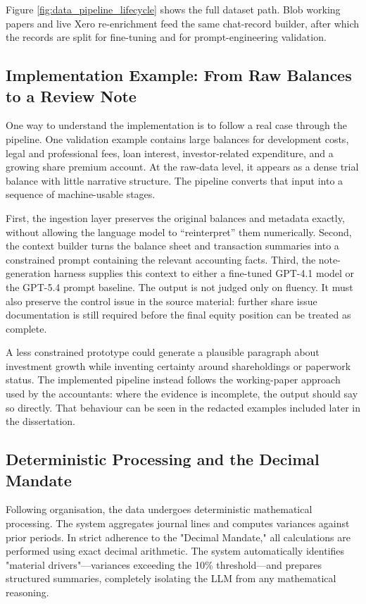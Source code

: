 Figure \ref{fig:data_pipeline_lifecycle} shows the full dataset path. Blob working papers and live Xero re-enrichment feed the same chat-record builder, after which the records are split for fine-tuning and for prompt-engineering validation.

\subsection{Implementation Example: From Raw Balances to a Review Note}
One way to understand the implementation is to follow a real case through the pipeline. One validation example contains large balances for development costs, legal and professional fees, loan interest, investor-related expenditure, and a growing share premium account. At the raw-data level, it appears as a dense trial balance with little narrative structure. The pipeline converts that input into a sequence of machine-usable stages.

First, the ingestion layer preserves the original balances and metadata exactly, without allowing the language model to ``reinterpret'' them numerically. Second, the context builder turns the balance sheet and transaction summaries into a constrained prompt containing the relevant accounting facts. Third, the note-generation harness supplies this context to either a fine-tuned GPT-4.1 model or the GPT-5.4 prompt baseline. The output is not judged only on fluency. It must also preserve the control issue in the source material: further share issue documentation is still required before the final equity position can be treated as complete.

A less constrained prototype could generate a plausible paragraph about investment growth while inventing certainty around shareholdings or paperwork status. The implemented pipeline instead follows the working-paper approach used by the accountants: where the evidence is incomplete, the output should say so directly. That behaviour can be seen in the redacted examples included later in the dissertation.

\subsection{Deterministic Processing and the Decimal Mandate}
Following organisation, the data undergoes deterministic mathematical processing. The system aggregates journal lines and computes variances against prior periods. In strict adherence to the "Decimal Mandate," all calculations are performed using exact decimal arithmetic. The system automatically identifies "material drivers"—variances exceeding the 10\% threshold—and prepares structured summaries, completely isolating the LLM from any mathematical reasoning.

